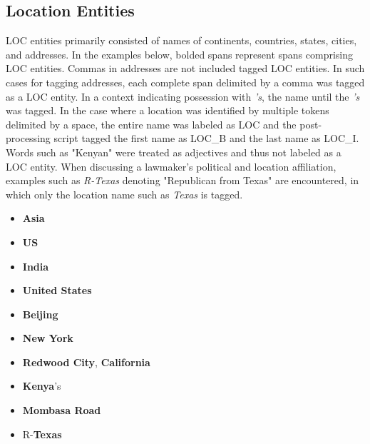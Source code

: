 \documentclass[11pt]{article}
\begin{document}
\subsection{Location Entities}
LOC entities primarily consisted of names of continents, countries, states, cities, and addresses. In the examples below, bolded spans represent spans comprising LOC entities. Commas in addresses are not included tagged LOC entities. In such cases for tagging addresses, each complete span delimited by a comma was tagged as a LOC entity. In a context indicating possession with \textit{'s}, the name until the \textit{'s} was tagged. In the case where a location was identified by multiple tokens delimited by a space, the entire name was labeled as LOC and the post-processing script tagged the first name as LOC\_B and the last name as LOC\_I. Words such as "Kenyan" were treated as adjectives and thus not labeled as a LOC entity. When discussing a lawmaker's political and location affiliation, examples such as \textit{R-Texas} denoting "Republican from Texas" are encountered, in which only the location name such as \textit{Texas} is tagged.
\begin{itemize}
    \item \textbf{Asia}
    \item \textbf{US}
    \item \textbf{India}
    \item \textbf{United States}
    \item \textbf{Beijing}
    \item \textbf{New York}
    \item \textbf{Redwood City}, \textbf{California}
    \item \textbf{Kenya}'s
    \item \textbf{Mombasa Road}
    \item R-\textbf{Texas}
\end{itemize}
\end{document}
